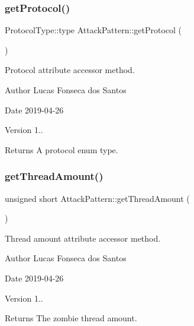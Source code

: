 \subsubsection{\texorpdfstring{get\+Protocol()}{getProtocol()}}
{\footnotesize\ttfamily Protocol\+Type\+::type Attack\+Pattern\+::get\+Protocol (\begin{DoxyParamCaption}{ }\end{DoxyParamCaption})}

Protocol attribute accessor method. \begin{DoxyAuthor}{Author}
Lucas Fonseca dos Santos 
\end{DoxyAuthor}
\begin{DoxyDate}{Date}
2019-\/04-\/26 
\end{DoxyDate}
\begin{DoxyVersion}{Version}
1..
\end{DoxyVersion}
\begin{DoxyReturn}{Returns}
A protocol enum type. 
\end{DoxyReturn}
\mbox{\label{classAttackPattern_a75dac1b1ad21f85adcb22f42287eab76}} 
\subsubsection{\texorpdfstring{get\+Thread\+Amount()}{getThreadAmount()}}
{\footnotesize\ttfamily unsigned short Attack\+Pattern\+::get\+Thread\+Amount (\begin{DoxyParamCaption}{ }\end{DoxyParamCaption})}

Thread amount attribute accessor method. \begin{DoxyAuthor}{Author}
Lucas Fonseca dos Santos 
\end{DoxyAuthor}
\begin{DoxyDate}{Date}
2019-\/04-\/26 
\end{DoxyDate}
\begin{DoxyVersion}{Version}
1..
\end{DoxyVersion}
\begin{DoxyReturn}{Returns}
The zombie thread amount. 
\end{DoxyReturn}
\mbox{\label{classAttackPattern_aee8d40c3f0159a8be0df27b5bb2e41dc}} 

